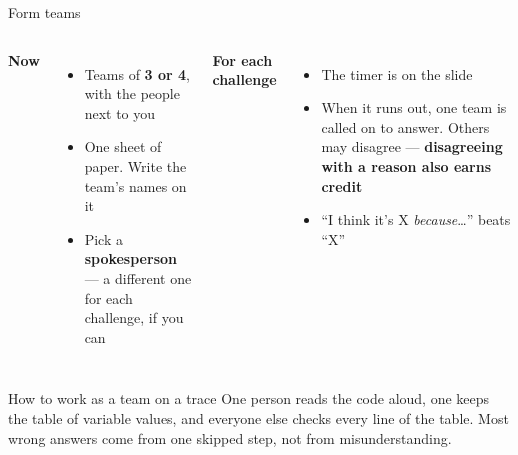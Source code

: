\documentclass[aspectratio=169]{beamer}
\newcommand{\neutrallabel}[1]{\textcolor{bkblue}{\textbf{#1}}}
\begin{document}
\begin{frame}{Form teams}
  \begin{columns}[T,onlytextwidth]
    \neutrallabel{Now}
    \begin{itemize}[itemsep=0.3em]
      \item Teams of \textbf{3 or 4}, with the people next to you
      \item One sheet of paper. Write the team's names on it
      \item Pick a \textbf{spokesperson} --- a different one for each challenge, if you can
    \end{itemize}
    \neutrallabel{For each challenge}
    \begin{itemize}[itemsep=0.3em]
      \item The timer is on the slide
      \item When it runs out, one team is called on to answer. Others may disagree ---
        \textbf{disagreeing with a reason also earns credit}
      \item ``I think it's X \emph{because}\ldots'' beats ``X''
    \end{itemize}
  \end{columns}
  \vspace{0.6em}
  \begin{contextbox}{How to work as a team on a trace}
    \small One person reads the code aloud, one keeps the table of variable values, and
    everyone else checks every line of the table. Most wrong answers come from one skipped
    step, not from misunderstanding.
  \end{contextbox}
\end{frame}
\end{document}
